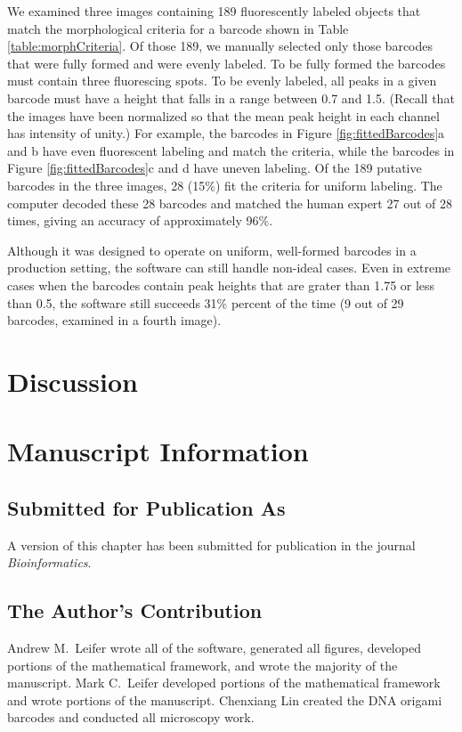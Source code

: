 We examined three images containing 189 fluorescently labeled objects that match the morphological criteria for a barcode shown in Table \ref{table:morphCriteria}. Of those 189, we manually selected only those barcodes that were fully formed and were evenly labeled. To be fully formed the barcodes must contain three fluorescing spots. To be evenly labeled, all peaks in a given barcode must have a height that falls in a range between 0.7 and 1.5. (Recall that the images have been normalized so that the mean peak height in each channel has intensity of unity.) For example, the barcodes in Figure \ref{fig:fittedBarcodes}a and b have even fluorescent labeling and match the criteria, while the barcodes in Figure \ref{fig:fittedBarcodes}c and d have uneven labeling. Of the 189 putative barcodes in the three images, 28 (15\%) fit the criteria for uniform labeling.   The computer decoded these 28 barcodes and matched the human expert 27 out of 28 times, giving an accuracy of approximately 96\%.


Although it was designed to operate on uniform, well-formed barcodes in a production setting, the software can still handle non-ideal cases. Even in extreme cases when the barcodes contain peak heights that are grater than 1.75 or  less than 0.5, the software still succeeds 31\% percent of the time (9 out of 29 barcodes, examined in a fourth image).


\section{Discussion}


\section{Manuscript Information}
\subsection{Submitted for Publication As}
A version of this chapter has been submitted for publication in the journal \textit{Bioinformatics}.

\subsection{The Author's Contribution}
Andrew M.~Leifer wrote all of the software, generated all figures, developed portions of the mathematical framework, and wrote the majority of the manuscript. Mark C.~Leifer developed portions of the mathematical framework and wrote portions of the manuscript. Chenxiang Lin created the DNA origami barcodes and conducted all microscopy work. 
 